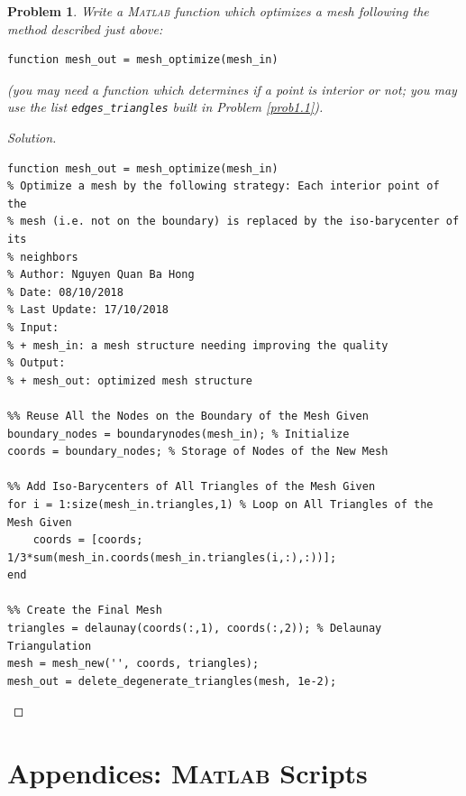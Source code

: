 \documentclass[11pt,a4paper,center,notitlepage]{article}
\numberwithin{equation}{section}
\newtheorem{prob}{Problem}[section]
\begin{document}
\begin{prob}
Write a \textsc{Matlab} function which optimizes a mesh following the method described just above:
\begin{verbatim}
function mesh_out = mesh_optimize(mesh_in)
\end{verbatim}
(you may need a function which determines if a point is interior or not; you may use the list \verb|edges_triangles| built in Problem \ref{prob1.1}).
\end{prob}

\begin{proof}[Solution]
\begin{verbatim}
function mesh_out = mesh_optimize(mesh_in)
% Optimize a mesh by the following strategy: Each interior point of the
% mesh (i.e. not on the boundary) is replaced by the iso-barycenter of its
% neighbors
% Author: Nguyen Quan Ba Hong
% Date: 08/10/2018
% Last Update: 17/10/2018
% Input:
% + mesh_in: a mesh structure needing improving the quality
% Output: 
% + mesh_out: optimized mesh structure

%% Reuse All the Nodes on the Boundary of the Mesh Given
boundary_nodes = boundarynodes(mesh_in); % Initialize
coords = boundary_nodes; % Storage of Nodes of the New Mesh

%% Add Iso-Barycenters of All Triangles of the Mesh Given
for i = 1:size(mesh_in.triangles,1) % Loop on All Triangles of the Mesh Given
    coords = [coords; 1/3*sum(mesh_in.coords(mesh_in.triangles(i,:),:))];
end

%% Create the Final Mesh
triangles = delaunay(coords(:,1), coords(:,2)); % Delaunay Triangulation
mesh = mesh_new('', coords, triangles);
mesh_out = delete_degenerate_triangles(mesh, 1e-2); 
\end{verbatim}
\end{proof}


\section{Appendices: \textsc{Matlab} Scripts}

 
\end{document}
